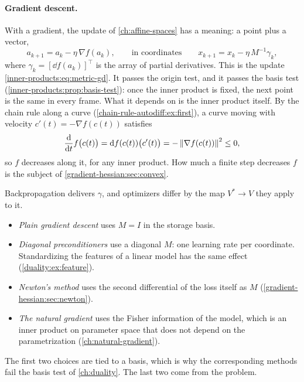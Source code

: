 \begin{notechapter}
\paragraph{Gradient descent.} With a gradient, the update of
\cref{ch:affine-spaces} has a meaning: a point plus a vector,
\begin{equation}\label{gradient-hessian:eq:gd}
  a_{k+1} = a_k - \eta\,\nabla f(a_k) ,
  \qquad\text{in coordinates}\qquad
  x_{k+1} = x_k - \eta\,M^{-1}\gamma_k ,
\end{equation}
where $\gamma_k = [\dd f(a_k)]^\top$ is the array of partial derivatives.
This is the update \eqref{inner-products:eq:metric-gd}. It passes the
origin test, and it passes the basis test
(\cref{inner-products:prop:basis-test}): once the inner product is fixed,
the next point is the same in every frame. What it depends on is the inner
product itself. By the chain rule along a curve
(\cref{chain-rule-autodiff:ex:first}), a curve moving with velocity
$c'(t) = -\nabla f(c(t))$ satisfies
\[
  \frac{\mathrm{d}}{\mathrm{d} t}f\bigl(c(t)\bigr) = \mathrm{d} f(c(t))\bigl(c'(t)\bigr)
  = -\left\|\nabla f(c(t))\right\|^2\leq0 ,
\]
so $f$ decreases along it, for any inner product. How much a finite step
decreases $f$ is the subject of \cref{gradient-hessian:sec:convex}.

\begin{mlthread}
Backpropagation delivers $\gamma$, and optimizers differ by the map
$V^*\to V$ they apply to it.
\begin{itemize}[nosep]
  \item \emph{Plain gradient descent} uses $M = I$ in the storage basis.
  \item \emph{Diagonal preconditioners} use a diagonal $M$: one learning
        rate per coordinate. Standardizing the features of a linear model
        has the same effect (\cref{duality:ex:feature}).
  \item \emph{Newton's method} uses the second differential of the loss
        itself as $M$ (\cref{gradient-hessian:sec:newton}).
  \item \emph{The natural gradient} uses the Fisher information of the
        model, which is an inner product on parameter space that does not
        depend on the parametrization (\cref{ch:natural-gradient}).
\end{itemize}
The first two choices are tied to a basis, which is why the corresponding
methods fail the basis test of \cref{ch:duality}. The last two come from
the problem.
\end{mlthread}


\end{notechapter}

